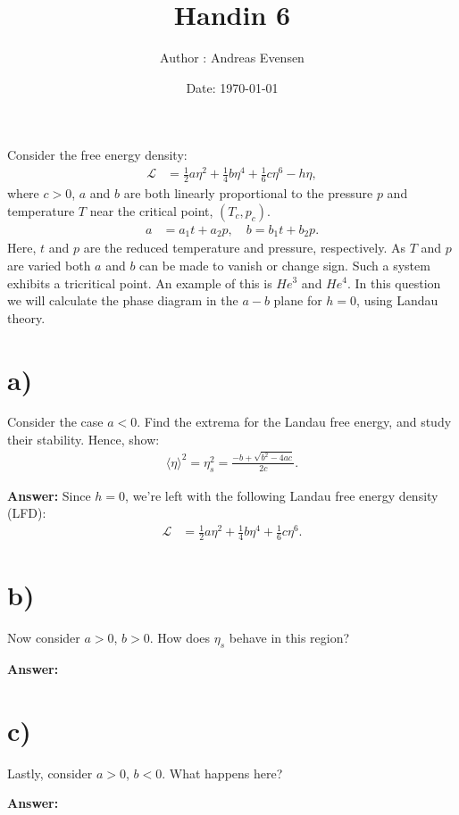 \documentclass[a4paper]{article}
\title{Handin 6}
\author{Author : Andreas Evensen}
\date{Date: \today}
\newcommand{\newparagraph}{\vspace{.5cm}\noindent}
\newcommand{\average}[1]{\langle #1 \rangle}
\begin{document}
\maketitle

\noindent
Consider the free energy density:
\begin{align*}
    \mathcal{L} &= \frac{1}{2}a\eta^2 + \frac{1}{4}b\eta^4 + \frac{1}{6}c\eta^6 - h\eta,
\end{align*}where $ c> 0 $, $a$ and $b$ are both linearly proportional to the pressure $p$ and temperature $T$ near the critical point, $(T_c, p_c)$.
\begin{align*}
    a &= a_1t + a_2p,\quad b = b_1t + b_2p.
\end{align*}Here, $t$ and $p$ are the reduced temperature and pressure, respectively.
As $T$ and $p$ are varied both $a$ and $b$ can be made to vanish or change sign.
Such a system exhibits a tricritical point. An example of this is $He^3$ and $He^4$.
In this question we will calculate the phase diagram in the $a-b$ plane for $h = 0$, using Landau theory.

\section*{a)}
Consider the case $a<0$. Find the extrema for the Landau free energy, and study their stability. Hence, show:
\begin{align*}
    \average{\eta}^2=\eta_s^2 = \frac{-b + \sqrt{b^2 - 4ac}}{2c}.
\end{align*}

\newparagraph
\textbf{Answer: } Since $h = 0$, we're left with the following Landau free energy density (LFD):
\begin{align}
    \mathcal{L} &= \frac{1}{2}a\eta^2 + \frac{1}{4}b\eta^4 + \frac{1}{6}c\eta^6. \label{eq: LFD}
\end{align}


\section*{b)}
Now consider $a>0$, $b>0$. How does $\eta_s$ behave in this region?

\newparagraph
\textbf{Answer: }
\section*{c)}
Lastly, consider $a>0$, $b<0$. What happens here?

\newparagraph
\textbf{Answer: }
\end{document}
